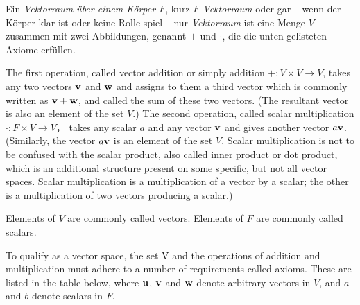 \begin{definition}[Vektorräume]
Ein \emph{Vektorraum über einem Körper $F$}, kurz \emph{$F$-Vektorraum} oder gar -- wenn der Körper klar ist oder keine Rolle spiel -- nur \emph{Vektorraum} ist eine Menge $V$ zusammen mit zwei Abbildungen, genannt $+$ und $\cdot$, die die unten gelisteten Axiome erfüllen.
	
	The first operation, called vector addition or simply addition $+ : V \times V \to V$, takes any two vectors $\mathbf{v}$ and $\mathbf{w}$ and assigns to them a third vector which is commonly written as $\mathbf{v} + \mathbf{w}$, and called the sum of these two vectors. (The resultant vector is also an element of the set $V$.)
	The second operation, called scalar multiplication $\cdot : F \times V \to V$， takes any scalar $a$ and any vector $\mathbf{v}$ and gives another vector $a\mathbf{v}$. (Similarly, the vector $a\mathbf{v}$ is an element of the set $V$. Scalar multiplication is not to be confused with the scalar product, also called inner product or dot product, which is an additional structure present on some specific, but not all vector spaces. Scalar multiplication is a multiplication of a vector by a scalar; the other is a multiplication of two vectors producing a scalar.)
	
	Elements of $V$ are commonly called vectors. Elements of $F$ are commonly called scalars.
	
	
	To qualify as a vector space, the set V and the operations of addition and multiplication must adhere to a number of requirements called axioms. These are listed in the table below, where $\mathbf{u}$, $\mathbf{v}$ and $\mathbf{w}$ denote arbitrary vectors in $V$, and $a$ and $b$ denote scalars in $F$.
	
	\begin{table}[!ht]
		\setlength\extrarowheight{10pt} %
		\begin{tabularx}{\textwidth}{C X}
			

\end{tabularx}
\end{table}
\end{definition}
